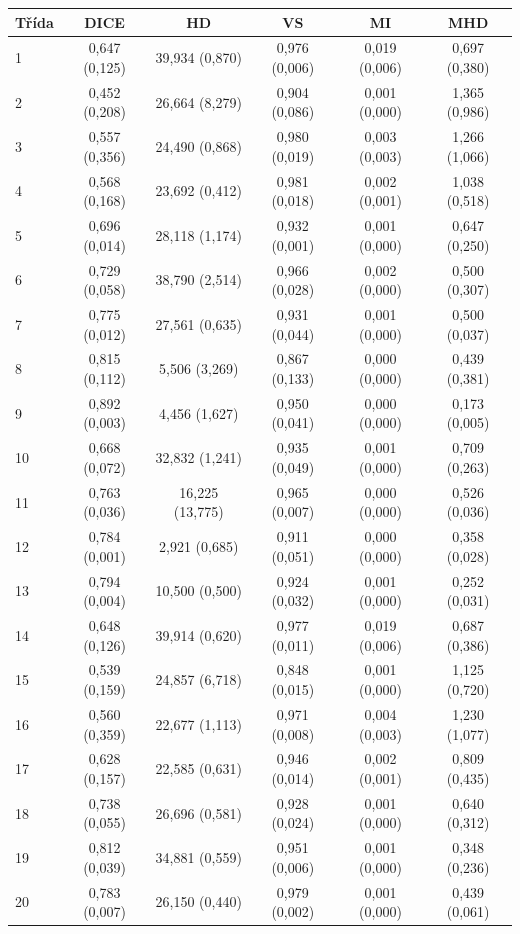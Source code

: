 \begin{tabular}{l c c c c c}
 \hline
Třída & DICE & HD & VS & MI & MHD \\ \hline
1 & 0,647 (0,125) & 39,934 (0,870) & 0,976 (0,006) & 0,019 (0,006) & 0,697 (0,380) \\
2 & 0,452 (0,208) & 26,664 (8,279) & 0,904 (0,086) & 0,001 (0,000) & 1,365 (0,986) \\
3 & 0,557 (0,356) & 24,490 (0,868) & 0,980 (0,019) & 0,003 (0,003) & 1,266 (1,066) \\
4 & 0,568 (0,168) & 23,692 (0,412) & 0,981 (0,018) & 0,002 (0,001) & 1,038 (0,518) \\
5 & 0,696 (0,014) & 28,118 (1,174) & 0,932 (0,001) & 0,001 (0,000) & 0,647 (0,250) \\
6 & 0,729 (0,058) & 38,790 (2,514) & 0,966 (0,028) & 0,002 (0,000) & 0,500 (0,307) \\
7 & 0,775 (0,012) & 27,561 (0,635) & 0,931 (0,044) & 0,001 (0,000) & 0,500 (0,037) \\
8 & 0,815 (0,112) & 5,506 (3,269) & 0,867 (0,133) & 0,000 (0,000) & 0,439 (0,381) \\
9 & 0,892 (0,003) & 4,456 (1,627) & 0,950 (0,041) & 0,000 (0,000) & 0,173 (0,005) \\
10 & 0,668 (0,072) & 32,832 (1,241) & 0,935 (0,049) & 0,001 (0,000) & 0,709 (0,263) \\
11 & 0,763 (0,036) & 16,225 (13,775) & 0,965 (0,007) & 0,000 (0,000) & 0,526 (0,036) \\
12 & 0,784 (0,001) & 2,921 (0,685) & 0,911 (0,051) & 0,000 (0,000) & 0,358 (0,028) \\
13 & 0,794 (0,004) & 10,500 (0,500) & 0,924 (0,032) & 0,001 (0,000) & 0,252 (0,031) \\
14 & 0,648 (0,126) & 39,914 (0,620) & 0,977 (0,011) & 0,019 (0,006) & 0,687 (0,386) \\
15 & 0,539 (0,159) & 24,857 (6,718) & 0,848 (0,015) & 0,001 (0,000) & 1,125 (0,720) \\
16 & 0,560 (0,359) & 22,677 (1,113) & 0,971 (0,008) & 0,004 (0,003) & 1,230 (1,077) \\
17 & 0,628 (0,157) & 22,585 (0,631) & 0,946 (0,014) & 0,002 (0,001) & 0,809 (0,435) \\
18 & 0,738 (0,055) & 26,696 (0,581) & 0,928 (0,024) & 0,001 (0,000) & 0,640 (0,312) \\
19 & 0,812 (0,039) & 34,881 (0,559) & 0,951 (0,006) & 0,001 (0,000) & 0,348 (0,236) \\
20 & 0,783 (0,007) & 26,150 (0,440) & 0,979 (0,002) & 0,001 (0,000) & 0,439 (0,061) \\

\end{tabular}

